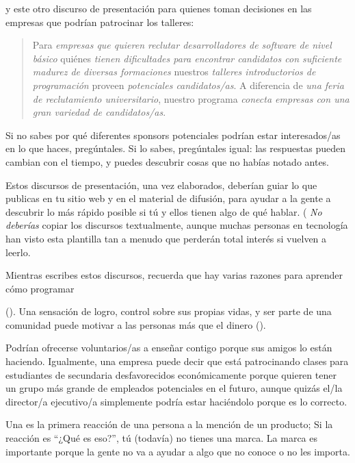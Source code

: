\noindent
y este otro discurso de presentación para quienes toman decisiones en las empresas que podrían patrocinar los talleres:

\begin{quote}

  Para \emph{empresas que quieren reclutar desarrolladores de software de nivel básico}
  quiénes \emph{tienen dificultades para  encontrar candidatos con suficiente madurez  de diversas formaciones}
  nuestros \emph{talleres introductorios de programación}
  proveen \emph{potenciales candidatos/as}.
  A diferencia de \emph{una feria de reclutamiento universitario},
  nuestro programa \emph{conecta empresas con una gran variedad de candidatos/as}.
\end{quote}

Si no sabes por qué diferentes sponsors potenciales podrían estar interesados/as en lo que haces,
pregúntales.
Si lo sabes,
pregúntales igual:
las respuestas pueden cambian con el tiempo,
y puedes descubrir cosas que no habías notado antes.

Estos discursos de presentación, una vez elaborados,
deberían guiar lo que publicas en tu sitio web y en el material de difusión,
para ayudar a la gente a descubrir lo más rápido posible
si tú y ellos tienen algo de qué hablar.
( \emph{No deberías} copiar los discursos textualmente,
aunque
muchas personas en tecnología han visto esta plantilla tan a menudo que 
perderán total interés si vuelven a leerlo. 

Mientras escribes estos discursos,
recuerda que hay varias razones para aprender cómo programar

().
Una sensación de logro,
control sobre sus propias vidas,
y ser parte de una comunidad puede motivar a las personas más que el dinero
().

Podrían ofrecerse voluntarios/as a enseñar contigo  
porque sus amigos lo están haciendo. Igualmente, una empresa puede decir que 
está patrocinando clases para estudiantes de secundaria desfavorecidos económicamente 
porque quieren tener un grupo más grande de empleados potenciales en el futuro, 
aunque quizás el/la director/a ejecutivo/a simplemente podría estar haciéndolo porque es lo correcto.


Una  es la primera reacción de una persona a la mención de un producto;
Si la reacción es “¿Qué es eso?”,
tú (todavía) no tienes una marca.
La marca es importante porque
la gente no va a ayudar a algo que no conoce o no les importa.

